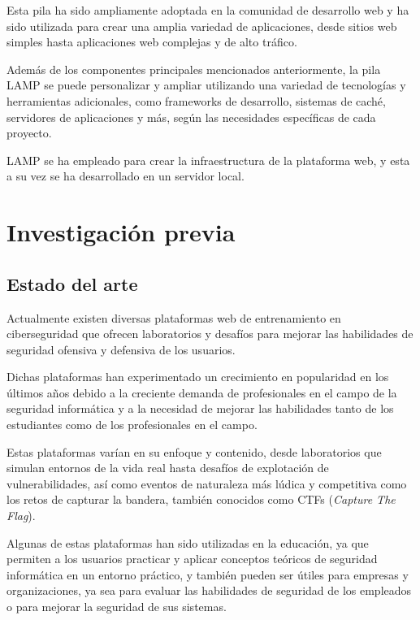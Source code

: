             Esta pila ha sido ampliamente adoptada en la comunidad de desarrollo web y ha sido utilizada para crear una amplia variedad de aplicaciones, desde sitios web simples hasta aplicaciones web complejas y de alto tráfico.

            Además de los componentes principales mencionados anteriormente, la pila LAMP se puede personalizar y ampliar utilizando una variedad de tecnologías y herramientas adicionales, como frameworks de desarrollo, sistemas de caché, servidores de aplicaciones y más, según las necesidades específicas de cada proyecto.

            LAMP se ha empleado para crear la infraestructura de la plataforma web, y esta a su vez se ha desarrollado en un servidor local.

            \cleardoublepage

    
\chapter{Investigación previa}
    \label{cap:investigacion-previa}  

    \section{Estado del arte}
        \label{cap:estado-arte}

        Actualmente existen diversas plataformas web de entrenamiento en ciberseguridad que ofrecen laboratorios y desafíos para mejorar las habilidades de seguridad ofensiva y defensiva de los usuarios.
        
        Dichas plataformas han experimentado un crecimiento en popularidad en los últimos años debido a la creciente demanda de profesionales en el campo de la seguridad informática y a la necesidad de mejorar las habilidades tanto de los estudiantes como de los profesionales en el campo.
        
        Estas plataformas varían en su enfoque y contenido, desde laboratorios que simulan entornos de la vida real hasta desafíos de explotación de vulnerabilidades, así como eventos de naturaleza más lúdica y competitiva como los retos de capturar la bandera, también conocidos como CTFs (\textit{Capture The Flag}).
        
        Algunas de estas plataformas han sido utilizadas en la educación, ya que permiten a los usuarios practicar y aplicar conceptos teóricos de seguridad informática en un entorno práctico, y también pueden ser útiles para empresas y organizaciones, ya sea para evaluar las habilidades de seguridad de los empleados o para mejorar la seguridad de sus sistemas.
        
